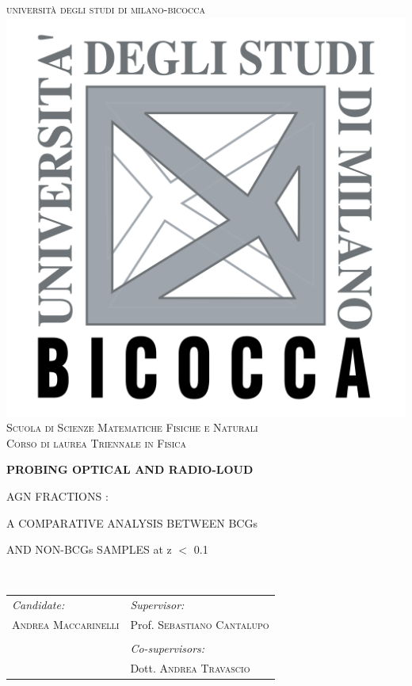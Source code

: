 \documentclass[a4]{article}
\newcommand{\HRule}{\rule{\linewidth}{0.5mm}} %
\begin{document}
\center %
 
{ 
\textsc{\LARGE {università degli studi di milano-bicocca}}\\[1cm] %
}
\includegraphics[width = .25\textwidth]{logo_unimib.png}\\[1cm] %
\textsc{ \large {Scuola di Scienze Matematiche Fisiche e Naturali}}\\[0.25cm]%
\textsc{\large {Corso di laurea Triennale in Fisica}}\\[0.75cm] %


\vspace{1.5cm}
{ 
{\large\bfseries PROBING OPTICAL AND RADIO-LOUD

 AGN FRACTIONS :

 A COMPARATIVE ANALYSIS BETWEEN BCGs 
 
AND NON-BCGs SAMPLES at z $<$ 0.1 }\\[0.5cm] %
}
\vspace{3cm}
 
\begin{table}[htb!]
\centering
\begin{tabularx}{\textwidth}{X X}
\emph{Candidate:} & \emph{Supervisor:} \\
\textsc{Andrea Maccarinelli} & Prof. \textsc{Sebastiano Cantalupo}  \\
& \\
& \emph{Co-supervisors:} \\
& Dott. \textsc{Andrea Travascio} \\
\end{tabularx}
\end{table}
\end{document}
